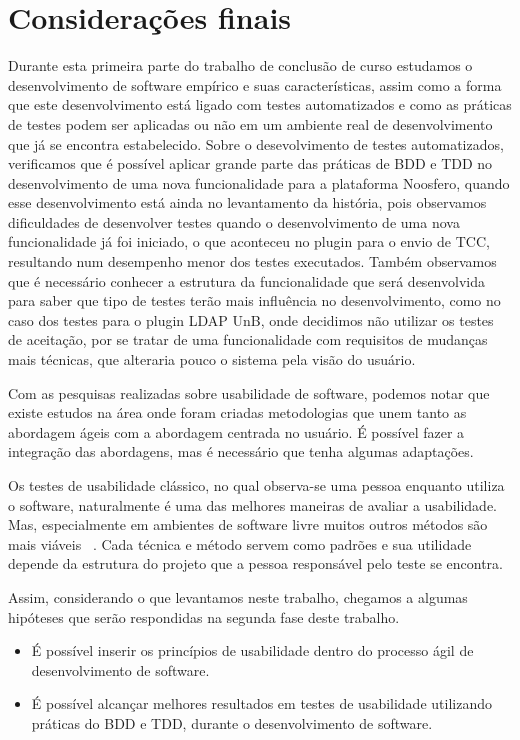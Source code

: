 \chapter{Considerações finais}
\label{consideracoes-finais}

Durante esta primeira parte do trabalho de conclusão de curso estudamos o desenvolvimento de software empírico e suas características, assim como a forma que este desenvolvimento está ligado com testes automatizados e como as práticas de testes podem ser aplicadas ou não em um ambiente real de desenvolvimento que já se encontra estabelecido. Sobre o desevolvimento de testes automatizados, verificamos que é possível aplicar grande parte das práticas de BDD e TDD no desenvolvimento de uma nova funcionalidade para a plataforma Noosfero, quando esse desenvolvimento está ainda no levantamento da história, pois observamos dificuldades de desenvolver testes quando o desenvolvimento de uma nova funcionalidade já foi iniciado, o que aconteceu no plugin para o envio de TCC, resultando num desempenho menor dos testes executados. Também observamos que é necessário conhecer a estrutura da funcionalidade que será desenvolvida para saber que tipo de testes terão mais influência no desenvolvimento, como no caso dos testes para o plugin LDAP UnB, onde decidimos não utilizar os testes de aceitação, por se tratar de uma funcionalidade com requisitos de mudanças mais técnicas, que alteraria pouco o sistema pela visão do usuário.

Com as pesquisas realizadas sobre usabilidade de software, podemos notar que existe estudos na área onde foram criadas metodologias que unem tanto as abordagem ágeis com a abordagem centrada no usuário. É possível fazer a integração das abordagens, mas é necessário que tenha algumas adaptações.

Os testes de usabilidade clássico, no qual observa-se uma pessoa enquanto utiliza o software, naturalmente é uma das melhores maneiras de avaliar a usabilidade. Mas, especialmente em ambientes de software livre muitos outros métodos são mais viáveis ~\cite{borchardt2011}. Cada técnica e método servem como padrões e sua utilidade depende da estrutura do projeto que a pessoa responsável pelo teste se encontra. 

Assim, considerando o que levantamos neste trabalho, chegamos a algumas hipóteses que serão respondidas na segunda fase deste trabalho.

\begin{itemize}
\item É possível inserir os princípios de usabilidade dentro do processo ágil de desenvolvimento de software.
\item É possível alcançar melhores resultados em testes de usabilidade utilizando práticas do BDD e TDD, durante o desenvolvimento de software.
\end{itemize}

